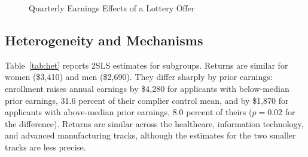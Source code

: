 \documentclass[12pt]{article}
\begin{document}
\begin{figure}[htbp]
\centering
{}
\caption{Quarterly Earnings Effects of a Lottery Offer}
\label{fig:quarterly}
\end{figure}

\subsection{Heterogeneity and Mechanisms}

Table~\ref{tab:het} reports 2SLS estimates for subgroups. Returns are similar for women (\$3,410) and men (\$2,690). They differ sharply by prior earnings: enrollment raises annual earnings by \$4,280 for applicants with below-median prior earnings, 31.6 percent of their complier control mean, and by \$1,870 for applicants with above-median prior earnings, 8.0 percent of theirs ($p = 0.02$ for the difference). Returns are similar across the healthcare, information technology, and advanced manufacturing tracks, although the estimates for the two smaller tracks are less precise.
\end{document}
